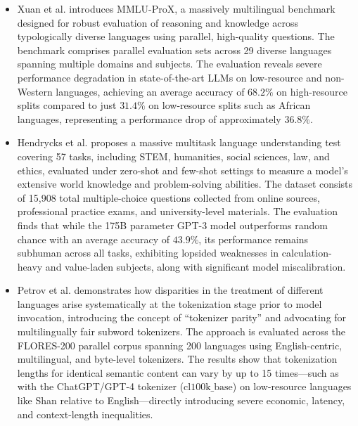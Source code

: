 \documentclass[11pt]{article}
\begin{document}
\begin{itemize}
\item Xuan et al. \cite{xuan-etal-2025-mmlu} introduces MMLU-ProX, a massively multilingual benchmark designed for robust evaluation of reasoning and knowledge across typologically diverse languages using parallel, high-quality questions. The benchmark comprises parallel evaluation sets across 29 diverse languages spanning multiple domains and subjects. The evaluation reveals severe performance degradation in state-of-the-art LLMs on low-resource and non-Western languages, achieving an average accuracy of $68.2\%$ on high-resource splits compared to just $31.4\%$ on low-resource splits such as African languages, representing a performance drop of approximately $36.8\%$.

\item Hendrycks et al. \cite{hendrycks2021measuring} proposes a massive multitask language understanding test covering 57 tasks, including STEM, humanities, social sciences, law, and ethics, evaluated under zero-shot and few-shot settings to measure a model's extensive world knowledge and problem-solving abilities. The dataset consists of 15,908 total multiple-choice questions collected from online sources, professional practice exams, and university-level materials. The evaluation finds that while the 175B parameter GPT-3 model outperforms random chance with an average accuracy of $43.9\%$, its performance remains subhuman across all tasks, exhibiting lopsided weaknesses in calculation-heavy and value-laden subjects, along with significant model miscalibration.

\item Petrov et al. \cite{petrov2023language} demonstrates how disparities in the treatment of different languages arise systematically at the tokenization stage prior to model invocation, introducing the concept of ``tokenizer parity'' and advocating for multilingually fair subword tokenizers. The approach is evaluated across the FLORES-200 parallel corpus spanning 200 languages using English-centric, multilingual, and byte-level tokenizers. The results show that tokenization lengths for identical semantic content can vary by up to 15 times—such as with the ChatGPT/GPT-4 tokenizer ($\text{cl100k\_base}$) on low-resource languages like Shan relative to English—directly introducing severe economic, latency, and context-length inequalities.
\end{itemize}
\end{document}
